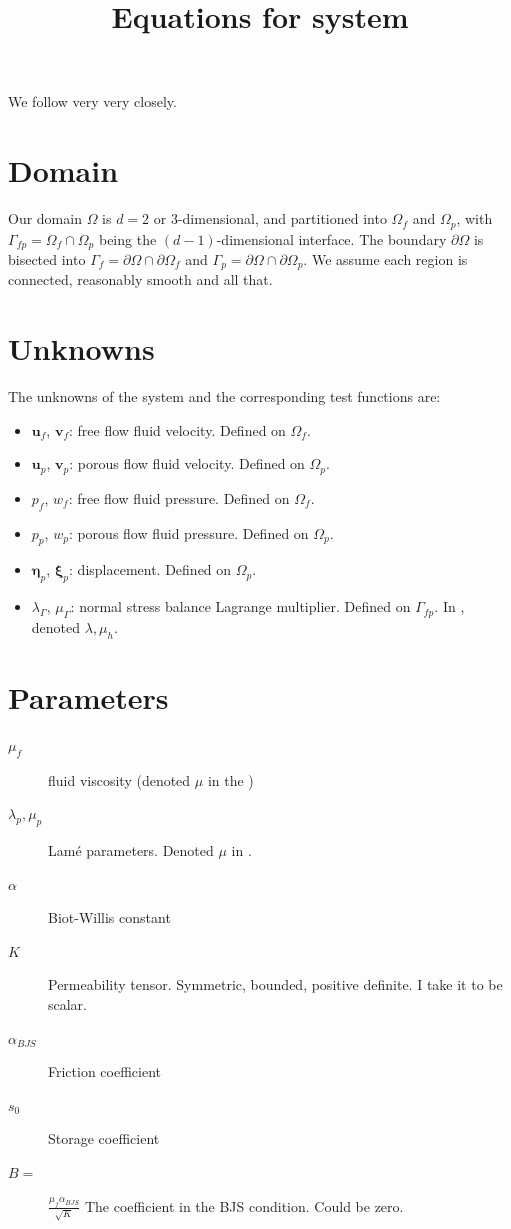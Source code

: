 \documentclass{article}
\newcommand{\mathspace}[1]{\ensuremath{#1}\xspace} %
\newcommand{\stokes}{\mathspace{\Omega_{f}}}
\newcommand{\stokesbdy}{\mathspace{\Gamma_{f}}}
\newcommand{\darcy}{\mathspace{\Omega_{p}}}
\newcommand{\darcybdy}{\mathspace{\Gamma_{p}}}
\newcommand{\interface}{\mathspace{\Gamma_{fp}}}
\newcommand{\uf}{\mathspace{\mathbf{u}_f}}
\newcommand{\vf}{\mathspace{\mathbf{v}_f}}
\newcommand{\up}{\mathspace{\mathbf{u}_p}}
\newcommand{\vp}{\mathspace{\mathbf{v}_p}}
\newcommand{\pf}{\mathspace{p_f}}
\newcommand{\pp}{\mathspace{p_p}}
\newcommand{\wf}{\mathspace{w_f}}
\renewcommand{\wp}{\mathspace{w_p}}
\newcommand{\disp}{\mathspace{\boldsymbol{\eta}_p}}
\newcommand{\disptest}{\mathspace{\boldsymbol{\xi}_p}}
\newcommand{\mult}{\mathspace{\lambda_{\Gamma}}}
\newcommand{\multtest}{\mathspace{\mu_{\Gamma}}}
\begin{document}
\title{Equations for system}
\maketitle


We follow \cite{ambartsumyan} very very closely.

\section{Domain}
Our domain $\Omega$ is $d=2 \text{ or } 3$-dimensional, and partitioned into \stokes and \darcy, with $\interface = \stokes \cap \darcy$ being the $(d-1)$-dimensional interface. The boundary $\partial \Omega$ is bisected into $\stokesbdy = \partial \Omega \cap \partial \stokes$ and $\darcybdy = \partial \Omega \cap \partial \darcy$. We assume each region is connected, reasonably smooth and all that.

\section{Unknowns}
The unknowns of the system and the corresponding test functions are:

\begin{itemize}
\item \uf, \vf : free flow fluid velocity. Defined on \stokes.
\item \up, \vp : porous flow fluid velocity. Defined on \darcy.
\item \pf, \wf : free flow fluid pressure. Defined on \stokes.
\item \pp, \wp : porous flow fluid pressure. Defined on \darcy.
\item \disp, \disptest : displacement. Defined on \darcy.
\item \mult, \multtest : normal stress balance Lagrange multiplier. Defined on \interface. In \cite{ambartsumyan}, denoted $\lambda, \mu_h$.

\end{itemize}

\section{Parameters}

\begin{description}
\item[$\mu_f$] fluid viscosity (denoted $\mu$ in the \cite{ambartsumyan})
  
\item[$\lambda_p, \mu_p$] Lamé parameters. Denoted $\mu$ in \cite{ambartsumyan}.
\item[$\alpha$] Biot-Willis constant
\item[$K$] Permeability tensor. Symmetric, bounded, positive definite. I take it to be scalar.
\item[$\alpha_{BJS}$] Friction coefficient
\item[$s_0$] Storage coefficient
\item[$B=$] $\frac {\mu_f \alpha_{BJS}} {\sqrt{K}}$ The coefficient in the BJS condition. Could be zero.
\end{description}
\end{document}
